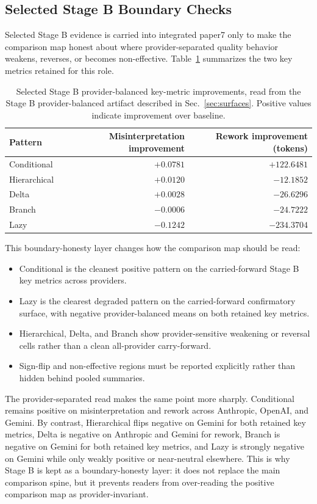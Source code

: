 \documentclass[11pt,a4paper]{article}
\begin{document}
\subsection{Selected Stage B Boundary Checks}

Selected Stage B evidence is carried into integrated paper7 only to make the comparison map honest about where provider-separated quality behavior weakens, reverses, or becomes non-effective. Table~\ref{tab:stageb_selected_integrated} summarizes the two key metrics retained for this role.

\begin{table}[t]
\centering
\small
\begin{tabular}{lrr}
\toprule
\textbf{Pattern} & \textbf{Misinterpretation improvement} & \textbf{Rework improvement (tokens)} \\
\midrule
Conditional & \(+0.0781\) & \(+122.6481\) \\
Hierarchical & \(+0.0120\) & \(-12.1852\) \\
Delta & \(+0.0028\) & \(-26.6296\) \\
Branch & \(-0.0006\) & \(-24.7222\) \\
Lazy & \(-0.1242\) & \(-234.3704\) \\
\bottomrule
\end{tabular}
\caption{Selected Stage B provider-balanced key-metric improvements, read from the Stage B provider-balanced artifact described in Sec.~\ref{sec:surfaces}. Positive values indicate improvement over baseline.}
\label{tab:stageb_selected_integrated}
\end{table}

This boundary-honesty layer changes how the comparison map should be read:
\begin{itemize}
  \item Conditional is the cleanest positive pattern on the carried-forward Stage B key metrics across providers.
  \item Lazy is the clearest degraded pattern on the carried-forward confirmatory surface, with negative provider-balanced means on both retained key metrics.
  \item Hierarchical, Delta, and Branch show provider-sensitive weakening or reversal cells rather than a clean all-provider carry-forward.
  \item Sign-flip and non-effective regions must be reported explicitly rather than hidden behind pooled summaries.
\end{itemize}

The provider-separated read makes the same point more sharply. Conditional remains positive on misinterpretation and rework across Anthropic, OpenAI, and Gemini. By contrast, Hierarchical flips negative on Gemini for both retained key metrics, Delta is negative on Anthropic and Gemini for rework, Branch is negative on Gemini for both retained key metrics, and Lazy is strongly negative on Gemini while only weakly positive or near-neutral elsewhere. This is why Stage B is kept as a boundary-honesty layer: it does not replace the main comparison spine, but it prevents readers from over-reading the positive comparison map as provider-invariant.
\end{document}
